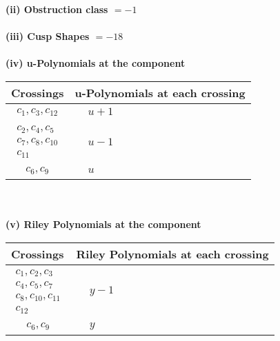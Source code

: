 \documentclass[1p]{elsarticle_modified}
\theoremstyle{definition}
\begin{document}
\flushleft \textbf{(ii) Obstruction class $= -1$}\\~\\
\flushleft \textbf{(iii) Cusp Shapes $= -18$}\\~\\
\newpage\renewcommand{\arraystretch}{1}
\flushleft \textbf{(iv) u-Polynomials at the component}\newline \\
\begin{tabular}{m{50pt}|m{274pt}}
Crossings & \hspace{64pt}u-Polynomials at each crossing \\
\hline $$\begin{aligned}c_{1},c_{3},c_{12}\end{aligned}$$&$\begin{aligned}
&u+1
\end{aligned}$\\
\hline $$\begin{aligned}c_{2},c_{4},c_{5}\\c_{7},c_{8},c_{10}\\c_{11}\end{aligned}$$&$\begin{aligned}
&u-1
\end{aligned}$\\
\hline $$\begin{aligned}c_{6},c_{9}\end{aligned}$$&$\begin{aligned}
&u
\end{aligned}$\\
\hline
\end{tabular}\\~\\
\newpage\renewcommand{\arraystretch}{1}
\flushleft \textbf{(v) Riley Polynomials at the component}\newline \\
\begin{tabular}{m{50pt}|m{274pt}}
Crossings & \hspace{64pt}Riley Polynomials at each crossing \\
\hline $$\begin{aligned}c_{1},c_{2},c_{3}\\c_{4},c_{5},c_{7}\\c_{8},c_{10},c_{11}\\c_{12}\end{aligned}$$&$\begin{aligned}
&y-1
\end{aligned}$\\
\hline $$\begin{aligned}c_{6},c_{9}\end{aligned}$$&$\begin{aligned}
&y
\end{aligned}$\\
\hline
\end{tabular}\\~\\
\end{document}
